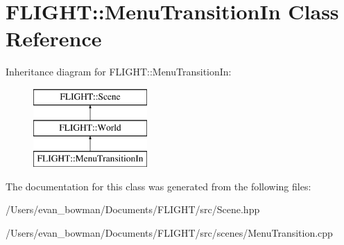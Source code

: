 \hypertarget{class_f_l_i_g_h_t_1_1_menu_transition_in}{}\section{F\+L\+I\+G\+HT\+:\+:Menu\+Transition\+In Class Reference}
\label{class_f_l_i_g_h_t_1_1_menu_transition_in}
Inheritance diagram for F\+L\+I\+G\+HT\+:\+:Menu\+Transition\+In\+:\begin{figure}[H]
\begin{center}
\leavevmode
\includegraphics[height=3.000000cm]{class_f_l_i_g_h_t_1_1_menu_transition_in}
\end{center}
\end{figure}


The documentation for this class was generated from the following files\+:\begin{DoxyCompactItemize}
\item 
/\+Users/evan\+\_\+bowman/\+Documents/\+F\+L\+I\+G\+H\+T/src/Scene.\+hpp\item 
/\+Users/evan\+\_\+bowman/\+Documents/\+F\+L\+I\+G\+H\+T/src/scenes/Menu\+Transition.\+cpp\end{DoxyCompactItemize}
